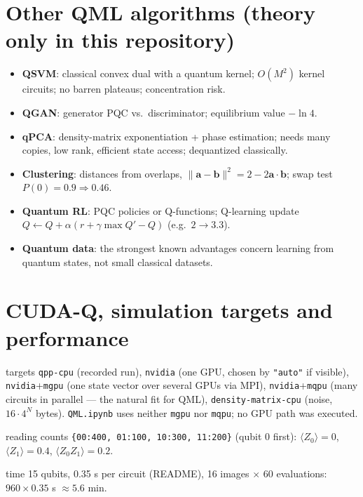 \documentclass[11pt,a4paper,openany]{book}
\newcounter{wex}[chapter]
\begin{document}
\section{Other QML algorithms (theory only in this repository)}
\begin{itemize}[itemsep=2pt]
\item \textbf{QSVM}: classical convex dual with a quantum kernel; $O(M^2)$ kernel circuits; no barren plateaus; concentration risk.
\item \textbf{QGAN}: generator PQC vs.\ discriminator; equilibrium value $-\ln4$.
\item \textbf{qPCA}: density-matrix exponentiation + phase estimation; needs many copies, low rank, efficient state access; dequantized classically.
\item \textbf{Clustering}: distances from overlaps, $\|\mathbf a - \mathbf b\|^2 = 2 - 2\mathbf a\cdot\mathbf b$; swap test $P(0) = 0.9 \Rightarrow 0.46$.
\item \textbf{Quantum RL}: PQC policies or Q-functions; Q-learning update $Q \leftarrow Q + \alpha(r + \gamma\max Q' - Q)$ (e.g.\ $2 \to 3.3$).
\item \textbf{Quantum data}: the strongest known advantages concern learning from quantum states, not small classical datasets.
\end{itemize}

\section{CUDA-Q, simulation targets and performance}
\begin{keyres}{targets}
\texttt{qpp-cpu} (recorded run), \texttt{nvidia} (one GPU, chosen by \texttt{"auto"} if visible), \texttt{nvidia}+\texttt{mgpu} (one state vector over
several GPUs via MPI), \texttt{nvidia}+\texttt{mqpu} (many circuits in parallel --- the natural fit for QML), \texttt{density-matrix-cpu} (noise,
$16\cdot4^N$ bytes). \texttt{QML.ipynb} uses neither \texttt{mgpu} nor \texttt{mqpu}; no GPU path was executed.
\end{keyres}
\begin{wexample}{reading counts}
\texttt{\{00:400, 01:100, 10:300, 11:200\}} (qubit 0 first): $\langle Z_0\rangle = 0$, $\langle Z_1\rangle = 0.4$, $\langle Z_0Z_1\rangle = 0.2$.
\end{wexample}
\begin{wexample}{time}
15 qubits, 0.35 s per circuit (README), 16 images $\times$ 60 evaluations: $960\times0.35$ s $\approx 5.6$ min.
\end{wexample}
\end{document}

